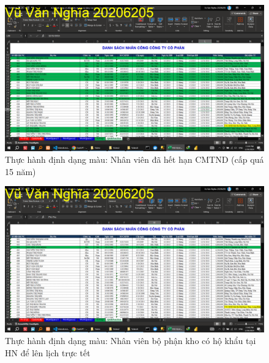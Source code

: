 \documentclass{article}
\begin{document}
\begin{figure}[H]
\centering
\includegraphics[scale = 0.15]{Video8/ThucHanh/5.png}
\caption{Thực hành định dạng màu: Nhân viên đã hết hạn CMTND (cấp quá 15 năm)}
\end{figure}

\begin{figure}[H]
\centering
\includegraphics[scale = 0.15]{Video8/ThucHanh/6.png}
\caption{Thực hành định dạng màu: Nhân viên bộ phận kho có hộ khẩu tại HN để lên lịch trực tết}
\end{figure}
\end{document}
